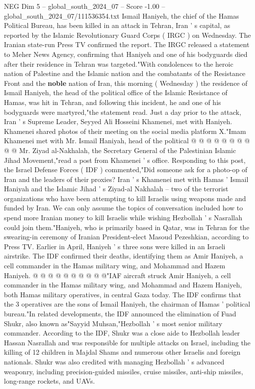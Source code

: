 \begin{textsample}{NEG Dim 5 – global\_south\_2024\_07 – Score -1.00 – global\_south\_2024\_07/111536354.txt}  \label{ex:f5_neg_290}
Ismail Haniyeh, the chief of the Hamas Political Bureau, has been killed in an attack in Tehran, Iran ' s capital, as reported by the Islamic Revolutionary Guard Corps ( IRGC ) on Wednesday.
The Iranian state-run Press TV confirmed the report.
The IRGC released a statement to Meher News Agency, confirming that Haniyeh and one of his bodyguards died after their residence in Tehran was targeted."With condolences to the heroic nation of Palestine and the Islamic nation and the combatants of the Resistance Front and the \textbf{noble} nation of Iran, this morning ( Wednesday ) the residence of Ismail Haniyeh, the head of the political office of the Islamic Resistance of Hamas, was hit in Tehran, and following this incident, he and one of his bodyguards were martyred,"the statement read.
Just a day prior to the attack, Iran ' s Supreme Leader, Seyyed Ali Hosseini Khamenei, met with Haniyeh.
Khamenei shared photos of their meeting on the social media platform X."Imam Khamenei met with Mr.
Ismail Haniyah, head of the political @ @ @ @ @ @ @ @ @ @ Mr.
Ziyad al-Nakhalah, the Secretary General of the Palestinian Islamic Jihad Movement,"read a post from Khamenei ' s office.
Responding to this post, the Israel Defense Forces ( IDF ) commented,"Did someone ask for a photo-op of Iran and the leaders of their proxies?
Iran ' s Khamenei met with Hamas ' Ismail Haniyah and the Islamic Jihad ' s Ziyad-al Nakhalah -- two of the terrorist organizations who have been attempting to kill Israelis using weapons made and funded by Iran.
We can only assume the topics of conversation included how to spend more Iranian money to kill Israelis while wishing Hezbollah ' s Nasrallah could join them."Haniyeh, who is primarily based in Qatar, was in Tehran for the swearing-in ceremony of Iranian President-elect Masoud Pezeshkian, according to Press TV.
Earlier in April, Haniyeh ' s three sons were killed in an Israeli airstrike.
The IDF confirmed their deaths, identifying them as Amir Haniyeh, a cell commander in the Hamas military wing, and Mohammad and Hazem Haniyeh. @ @ @ @ @ @ @ @ @ @"IAF aircraft struck Amir Haniyeh, a cell commander in the Hamas military wing, and Mohammad and Hazem Haniyeh, both Hamas military operatives, in central Gaza today.
The IDF confirms that the 3 operatives are the sons of Ismail Haniyeh, the chairman of Hamas ' political bureau."In related developments, the IDF announced the elimination of Fuad Shukr, also known as"Sayyid Muhsan,"Hezbollah ' s most senior military commander.
According to the IDF, Shukr was a close aide to Hezbollah leader Hassan Nasrallah and was responsible for multiple attacks on Israel, including the killing of 12 children in Majdal Shams and numerous other Israelis and foreign nationals.
Shukr was also credited with managing Hezbollah ' s advanced weaponry, including precision-guided missiles, cruise missiles, anti-ship missiles, long-range rockets, and UAVs.

\end{textsample}

